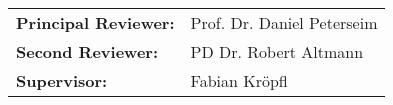 {
	\vspace*{19.5cm}
	
	\Large{
	\def\arraystretch{1.2}
	\begin{tabular}{l l}
	
		\textbf{Principal Reviewer:} & Prof. Dr. Daniel Peterseim \\
		\textbf{Second Reviewer:} & PD Dr. Robert Altmann \\
		\textbf{Supervisor:} & Fabian Kröpfl
	\end{tabular}
	}\par
	
	\def\arraystretch{1}
}
\restoregeometry
\pagebreak